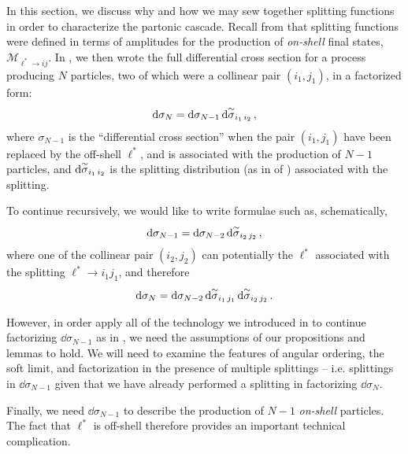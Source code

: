 In this section, we discuss why and how we may sew together splitting functions in order to characterize the partonic cascade.
%
Recall from  that splitting functions were defined in terms of amplitudes for the production of \textit{on-shell} final states, \(\mathcal{M}_{\ell^* \to i j}\).
%
In \Eq{}, we then wrote the full differential cross section for a process producing \(N\) particles, two of which were a collinear pair \((i_1, j_1)\), in a factorized form:
%
\begin{align}
    \dd \sigma_N
    =
    \dd \sigma_{N-1}
    \,
    \dd\overset{\sim}{\sigma}_{i_1\,i_2}
    \,,
\end{align}
where \(\sigma_{N-1}\) is the ``differential cross section'' when the pair \((i_1,j_1)\) have been replaced by the off-shell \(\ell^*\), and is associated with the production of \(N-1\) particles, and \(\dd\overset{\sim}{\sigma}_{i_1\, i_2}\) is the splitting distribution (as in  of ) associated with the splitting.

To continue recursively, we would like to write formulae such as, schematically,
\begin{align}
    \label{eq:cross-section-first-recursion}
    \dd\sigma_{N-1}
    =
    \dd \sigma_{N-2}
    \,
    \dsigmatilde_{i_2 \, j_2}
    \,,
\end{align}
where one of the collinear pair \((i_2, j_2)\) can potentially the \(\ell^*\) associated with the splitting \(\ell^* \to i_1 j_1\), and therefore
\begin{align}
    \dd \sigma_N
    =
    \dd \sigma_{N-2}
    \,
    \dd\overset{\sim}{\sigma}_{i_1 \, j_1}
    \,
    \dd\overset{\sim}{\sigma}_{i_2 \, j_2}
    \,.
\end{align}

However, in order apply all of the technology we introduced in  to continue factorizing \(\dd\sigma_{N-1}\) as in , we need the assumptions of our propositions and lemmas to hold.
%
We will need to examine the features of angular ordering, the soft limit, and factorization in the presence of multiple splittings -- i.e. splittings in \(\dd \sigma_{N-1}\) given that we have already performed a splitting in factorizing \(\dd\sigma_N\).

Finally, we need \(\dd\sigma_{N-1}\) to describe the production of \(N-1\) \textit{on-shell} particles.
%
The fact that \(\ell^*\) is off-shell therefore provides an important technical complication.


